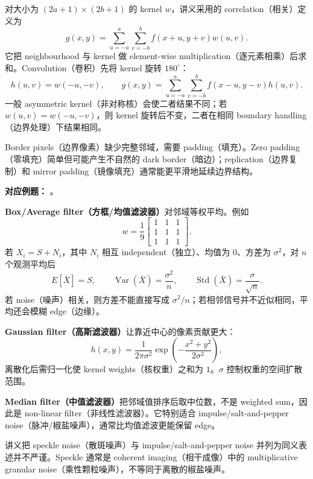 对大小为 $(2a+1)\times(2b+1)$ 的 kernel $w$，讲义采用的 correlation（相关）定义为
\[
  \boxed{g(x,y)=\sum_{u=-a}^{a}\sum_{v=-b}^{b}
  f(x+u,y+v)w(u,v)}.
\]
它把 neighbourhood 与 kernel 做 element-wise multiplication（逐元素相乘）后求和。Convolution（卷积）先将 kernel 旋转 $180^\circ$：
\[
  h(u,v)=w(-u,-v),
  \qquad
  g(x,y)=\sum_{u=-a}^{a}\sum_{v=-b}^{b}f(x-u,y-v)h(u,v).
\]
一般 asymmetric kernel（非对称核）会使二者结果不同；若 $w(u,v)=w(-u,-v)$，则 kernel 旋转后不变，二者在相同 boundary handling（边界处理）下结果相同。

Border pixels（边界像素）缺少完整邻域，需要 padding（填充）。Zero padding（零填充）简单但可能产生不自然的 dark border（暗边）；replication（边界复制）和 mirror padding（镜像填充）通常能更平滑地延续边界结构。

\textbf{对应例题：}
。


\textbf{Box/Average filter（方框/均值滤波器）}对邻域等权平均。例如
\[
  w=\frac{1}{9}
  \begin{bmatrix}
    1&1&1\\1&1&1\\1&1&1
  \end{bmatrix}.
\]
若 $X_i=S+N_i$，其中 $N_i$ 相互 independent（独立）、均值为 $0$、方差为 $\sigma^2$，对 $n$ 个观测平均后
\[
  E[\bar X]=S,
  \qquad
  \operatorname{Var}(\bar X)=\frac{\sigma^2}{n},
  \qquad
  \operatorname{Std}(\bar X)=\frac{\sigma}{\sqrt n}.
\]
若 noise（噪声）相关，则方差不能直接写成 $\sigma^2/n$；若相邻信号并不近似相同，平均还会模糊 edge（边缘）。

\textbf{Gaussian filter（高斯滤波器）}让靠近中心的像素贡献更大：
\[
  h(x,y)=\frac{1}{2\pi\sigma^2}
  \exp\!\left(-\frac{x^2+y^2}{2\sigma^2}\right),
\]
离散化后需归一化使 kernel weights（核权重）之和为 $1$。$\sigma$ 控制权重的空间扩散范围。

\textbf{Median filter（中值滤波器）}把邻域值排序后取中位数，不是 weighted sum，因此是 non-linear filter（非线性滤波器）。它特别适合 impulse/salt-and-pepper noise（脉冲/椒盐噪声），通常比均值滤波更能保留 edge。

\begin{remark}
讲义把 speckle noise（散斑噪声）与 impulse/salt-and-pepper noise 并列为同义表述并不严谨。Speckle 通常是 coherent imaging（相干成像）中的 multiplicative granular noise（乘性颗粒噪声），不等同于离散的椒盐噪声。
\end{remark}


